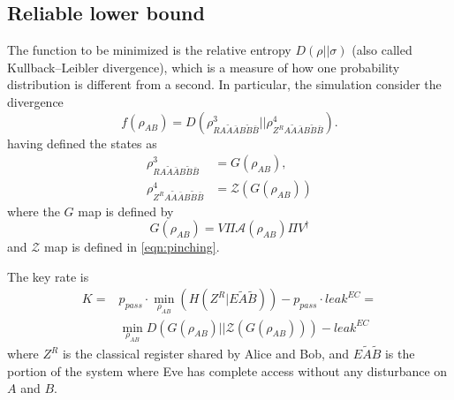 \documentclass{article}
\begin{document}
    \subsection{Reliable lower bound}
    The function to be minimized is the relative entropy \(D(\rho||\sigma)\) (also called Kullback–Leibler divergence), which is a measure of how one probability distribution is different from a second.
    In particular, the simulation consider the divergence
    \begin{equation}
        f(\rho_{AB}) = D\left(\rho^3_{RA\tilde{A}\bar{A}B\tilde{B}\bar{B}}\big\vert\big\vert\rho^4_{Z^RA\tilde{A}\bar{A}B\tilde{B}\bar{B}}\right).
        \label{eqn:relative-entropy}
    \end{equation}
    having defined the states as
    \begin{align*}
        \rho^3_{RA\tilde{A}\bar{A}B\tilde{B}\bar{B}} &= G(\rho_{AB}),\\
        \rho^4_{Z^RA\tilde{A}\bar{A}B\tilde{B}\bar{B}} &= \mathcal{Z}(G(\rho_{AB}))
    \end{align*}
    where the \(G\) map is defined by
    \[G(\rho_{AB}) = V\Pi \mathcal{A}(\rho_{AB})\Pi V^{\dagger}\]
    and \(\mathcal{Z}\) map is defined in \eqref{eqn:pinching}.

    The key rate is
    \begin{align}
        K =& p_{pass} \cdot \min_{\rho_{AB}}\left( H(Z^R | E\tilde{A}\tilde{B})\right)-p_{pass}\cdot leak^{EC} =\nonumber\\
        & \min_{\rho_{AB}} D\left( G(\rho_{AB}) ||\mathcal{Z}(G(\rho_{AB}))\right) - leak^{EC}
        \label{eqn:key-rate}
    \end{align}
    where \(Z^R\) is the classical register shared by Alice and Bob, and \(E\tilde{A}\tilde{B}\) is the portion of the system where Eve has complete access without any disturbance on \(A\) and \(B\).
\end{document}
